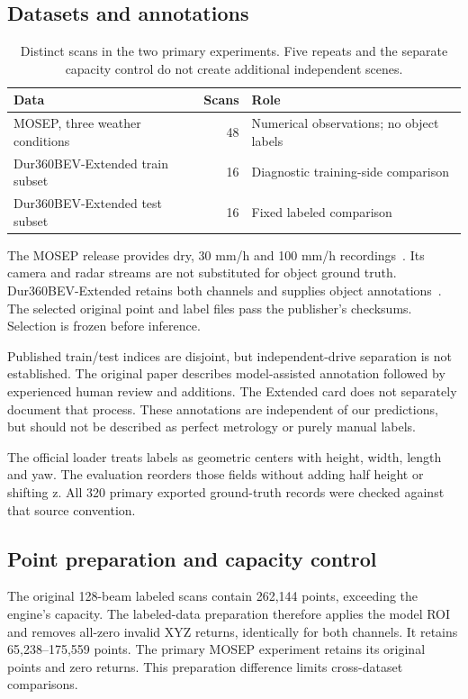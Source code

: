 \documentclass[11pt,a4paper]{article}
\begin{document}
\subsection{Datasets and annotations}
\begin{table}[htbp]\centering\small
\begin{tabularx}{\linewidth}{@{}l r Y@{}}
\toprule
Data & Scans & Role \\
\midrule
MOSEP, three weather conditions & 48 & Numerical observations; no object labels \\
Dur360BEV-Extended train subset & 16 & Diagnostic training-side comparison \\
Dur360BEV-Extended test subset & 16 & Fixed labeled comparison \\
\bottomrule
\end{tabularx}
\caption{Distinct scans in the two primary experiments. Five repeats and the
separate capacity control do not create additional independent scenes.}
\end{table}

The MOSEP release provides dry, 30 mm/h and 100 mm/h recordings~\cite{mosep}.
Its camera and radar streams are not substituted for object ground truth.
Dur360BEV-Extended retains both channels and supplies object
annotations~\cite{dur360,dur360extended}. The selected original point and label
files pass the publisher's checksums. Selection is frozen before inference.

Published train/test indices are disjoint, but independent-drive separation is
not established. The original paper describes model-assisted annotation
followed by experienced human review and additions. The Extended card does not
separately document that process. These annotations are independent of our
predictions, but should not be described as perfect metrology or purely manual
labels.

The official loader treats labels as geometric centers with height, width,
length and yaw. The evaluation reorders those fields without adding half height
or shifting z. All 320 primary exported ground-truth records were checked
against that source convention.

\subsection{Point preparation and capacity control}
The original 128-beam labeled scans contain 262,144 points, exceeding the
engine's capacity. The labeled-data preparation therefore applies the model
ROI and removes all-zero invalid XYZ returns, identically for both channels.
It retains 65,238--175,559 points. The primary MOSEP experiment retains its
original points and zero returns. This preparation difference limits
cross-dataset comparisons.
\end{document}
